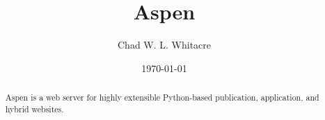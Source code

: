 \documentclass{manual}
\title{Aspen}
\author{Chad W. L. Whitacre}
\date\today
\begin{document}
\maketitle

\begin{abstract}

\noindent
Aspen is a web server for highly extensible Python-based publication,
application, and hybrid websites.

\end{abstract}





\end{document}
